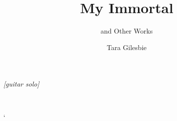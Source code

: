 \documentclass[2020/08/28 v2]{fanfic_book}
\title{My Immortal}
\subtitle{and Other Works}
\author{Tara Gilesbie}
\date{\DTMusedate{date}}
\begin{document}
\maketitle
\frontmatter
\tableofcontents


% 
\cleardoublepage\chapter*{}
\renewcommand{\epigraphflush}{center}\epigraph{\centering\emph{[guitar solo]}}{\centering{}\\\citeauthor{MCR-black_parade-dead}}
\mainmatter
\begingroup\let\clearpage\bigskip
{
	\sfcode`













































}
\endgroup
\cleardoublepage
\begingroup\let\clearpage\bigskip
\cleardoublepage





\endgroup
\cleardoublepage
\begingroup\let\clearpage\bigskip
\cleardoublepage

\endgroup
\end{document}
